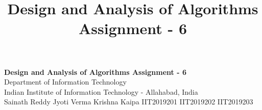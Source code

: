 \documentclass[10pt]{article}
\author{}
\title{\Large{Design and Analysis of Algorithms Assignment - 6}}
\begin{document}
	\begin{center}
		{\Large \textbf{Design and Analysis of Algorithms Assignment - 6}}\\
		\vspace{1em}
		{\large Department of Information Technology}\\
		\vspace{1em}
		\large{Indian Institute of Information Technology - Allahabad, India}\\
		\vspace{1em}
		\large{Sainath Reddy \hspace{10em} Jyoti Verma \hspace{10em} Krishna Kaipa}
		\large{IIT2019201 \hspace{10.5em} IIT2019202 \hspace{10.5em} IIT2019203}
		
		\vspace{2.5em}
	\end{center}
	
\end{document}
